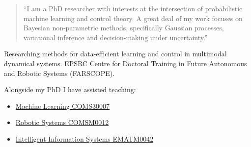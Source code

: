 \documentclass[10pt,a4paper,ragged2e,withhyper]{altacv}
\author{Aidan Scannell}
\date{\today}
\title{}
\begin{document}

\makecvheader

\begin{paracol}{2}

\begin{quote}
``I am a PhD researcher with interests at the intersection of probabilistic machine learning and control theory. A great deal of my work focuses on Bayesian non-parametric methods, specifically Gaussian processes, variational inference and decision-making under uncertainty.''
\end{quote}
\label{sec:orgad5079f}

Researching methods for data-efficient learning and control in multimodal dynamical systems. EPSRC Centre for Doctoral Training in Future Autonomous and Robotic Systems (FARSCOPE).


\par\divider
{}

Alongside my PhD I have assisted teaching:
\begin{itemize}
\item \href{https://www.bris.ac.uk/unit-programme-catalogue/UnitDetails.jsa?ayrCode=19\%2F20\&unitCode=COMS30007}{Machine Learning COMS30007}
\item \href{https://www.bris.ac.uk/unit-programme-catalogue/UnitDetails.jsa?ayrCode=19\%2F20\&unitCode=COMSM0012}{Robotic Systems COMSM0012}
\item \href{https://www.bris.ac.uk/unit-programme-catalogue/UnitDetails.jsa?ayrCode=19/20\\\&unitCode=EMATM0042}{Intelligent Information Systems EMATM0042}
\end{itemize}


\label{sec:org9a608c6}


\end{paracol}
\end{document}
